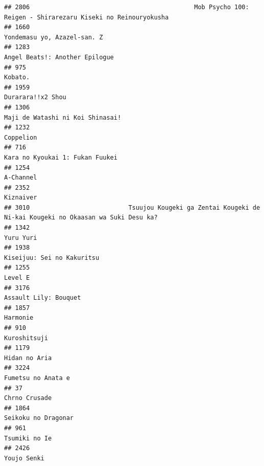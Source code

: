 \documentclass[
]{article}
\begin{document}
\begin{verbatim}
## 2806                                             Mob Psycho 100: Reigen - Shirarezaru Kiseki no Reinouryokusha
## 1660                                                                               Yondemasu yo, Azazel-san. Z
## 1283                                                                            Angel Beats!: Another Epilogue
## 975                                                                                                    Kobato.
## 1959                                                                                         Durarara!!x2 Shou
## 1306                                                                          Maji de Watashi ni Koi Shinasai!
## 1232                                                                                                 Coppelion
## 716                                                                            Kara no Kyoukai 1: Fukan Fuukei
## 1254                                                                                                 A-Channel
## 2352                                                                                                 Kiznaiver
## 3010                           Tsuujou Kougeki ga Zentai Kougeki de Ni-kai Kougeki no Okaasan wa Suki Desu ka?
## 1342                                                                                                 Yuru Yuri
## 1938                                                                                Kiseijuu: Sei no Kakuritsu
## 1255                                                                                                   Level E
## 3176                                                                                     Assault Lily: Bouquet
## 1857                                                                                                  Harmonie
## 910                                                                                               Kuroshitsuji
## 1179                                                                                             Hidan no Aria
## 3224                                                                                        Fumetsu no Anata e
## 37                                                                                               Chrno Crusade
## 1864                                                                                       Seikoku no Dragonar
## 961                                                                                              Tsumiki no Ie
## 2426                                                                                               Youjo Senki

\end{verbatim}
\end{document}
